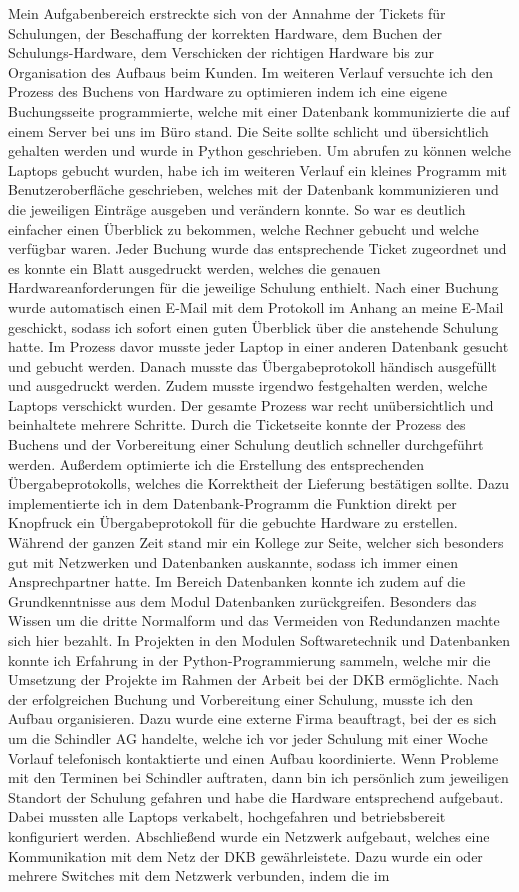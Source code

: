 Mein Aufgabenbereich erstreckte sich von der Annahme der Tickets für Schulungen, der Beschaffung der korrekten Hardware, dem Buchen der Schulungs-Hardware, dem Verschicken der richtigen Hardware bis zur Organisation des Aufbaus beim Kunden. Im weiteren Verlauf versuchte ich den Prozess des Buchens von Hardware zu optimieren indem ich eine eigene Buchungsseite programmierte, welche mit einer Datenbank kommunizierte die auf einem Server bei uns im Büro stand. Die Seite sollte schlicht und übersichtlich gehalten werden und wurde in Python geschrieben. Um abrufen zu können welche Laptops gebucht wurden, habe ich im weiteren Verlauf ein kleines Programm mit Benutzeroberfläche geschrieben, welches mit der Datenbank kommunizieren und die jeweiligen Einträge ausgeben und verändern konnte. So war es deutlich einfacher einen Überblick zu bekommen, welche Rechner gebucht und welche verfügbar waren. Jeder Buchung wurde das entsprechende Ticket zugeordnet und es konnte ein Blatt ausgedruckt werden, welches die genauen Hardwareanforderungen für die jeweilige Schulung enthielt. Nach einer Buchung wurde automatisch einen E-Mail mit dem Protokoll im Anhang an meine E-Mail geschickt, sodass ich sofort einen guten Überblick über die anstehende Schulung hatte. Im Prozess davor musste jeder Laptop in einer anderen Datenbank gesucht und gebucht werden. Danach musste das Übergabeprotokoll händisch ausgefüllt und ausgedruckt werden. Zudem musste irgendwo festgehalten werden, welche Laptops verschickt wurden. Der gesamte Prozess war recht unübersichtlich und beinhaltete mehrere Schritte. Durch die Ticketseite konnte der Prozess des Buchens und der Vorbereitung einer Schulung deutlich schneller durchgeführt werden. Außerdem optimierte ich die Erstellung des entsprechenden Übergabeprotokolls, welches die Korrektheit der Lieferung bestätigen sollte. Dazu implementierte ich in dem Datenbank-Programm die Funktion direkt per Knopfruck ein Übergabeprotokoll für die gebuchte Hardware zu erstellen. Während der ganzen Zeit stand mir ein Kollege zur Seite, welcher sich besonders gut mit Netzwerken und Datenbanken auskannte, sodass ich immer einen Ansprechpartner hatte. Im Bereich Datenbanken konnte ich zudem auf die Grundkenntnisse aus dem Modul Datenbanken zurückgreifen. Besonders das Wissen um die dritte Normalform und das Vermeiden von Redundanzen machte sich hier bezahlt. In Projekten in den Modulen Softwaretechnik und Datenbanken konnte ich Erfahrung in der Python-Programmierung sammeln, welche mir die Umsetzung der Projekte im Rahmen der Arbeit bei der DKB ermöglichte. Nach der erfolgreichen Buchung und Vorbereitung einer Schulung, musste ich den Aufbau organisieren. Dazu wurde eine externe Firma beauftragt, bei der es sich um die Schindler AG handelte, welche ich vor jeder Schulung mit einer Woche Vorlauf telefonisch kontaktierte und einen Aufbau koordinierte. Wenn Probleme mit den Terminen bei Schindler auftraten, dann bin ich persönlich zum jeweiligen Standort der Schulung gefahren und habe die Hardware entsprechend aufgebaut. Dabei mussten alle Laptops verkabelt, hochgefahren und betriebsbereit konfiguriert werden. Abschließend wurde ein Netzwerk aufgebaut, welches eine Kommunikation mit dem Netz der DKB gewährleistete. Dazu wurde ein oder mehrere Switches mit dem Netzwerk verbunden, indem die im 